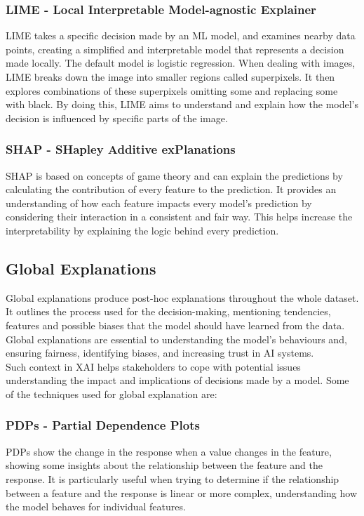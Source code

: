 \documentclass[10pt,journal,compsoc]{IEEEtran}
\begin{document}
\subsubsection{LIME - Local Interpretable Model-agnostic Explainer}
LIME takes a specific decision made by an ML model, and examines nearby data points, creating a simplified and interpretable model that represents a decision made locally\cite{phillips2020four}. The default model is logistic regression.
When dealing with images, LIME breaks down the image into smaller regions called superpixels. It then explores combinations of these superpixels omitting some and replacing some with black. By doing this, LIME aims to understand and explain how the model's decision is influenced by specific parts of the image.

\subsubsection{SHAP - SHapley Additive exPlanations} SHAP is based on concepts of game theory and can explain the predictions by calculating the contribution of every feature to the prediction. It provides an understanding of how each feature impacts every model's prediction by considering their interaction in a consistent and fair way. This helps increase the interpretability by explaining the logic behind every prediction.\cite{why-trust-you}

\subsection{Global Explanations}
Global explanations produce post-hoc explanations throughout the whole dataset. It outlines the process used for the decision-making, mentioning tendencies,\\
features and possible biases that the model should have learned from the data. Global explanations are essential to understanding the model's behaviours and,  ensuring fairness, identifying biases, and increasing trust in AI systems. \\
Such context in XAI helps stakeholders to cope with potential issues understanding the impact and implications of decisions made by a model. Some of the techniques used for global explanation are:

\subsubsection{PDPs - Partial Dependence Plots}
PDPs show the change in the response when a value changes in the feature, showing some insights about the relationship between the feature and the response. It is particularly useful when trying to determine if the relationship between a feature and the response is linear or more complex, understanding how the model behaves for individual features.\cite{phillips2020four}
\end{document}
